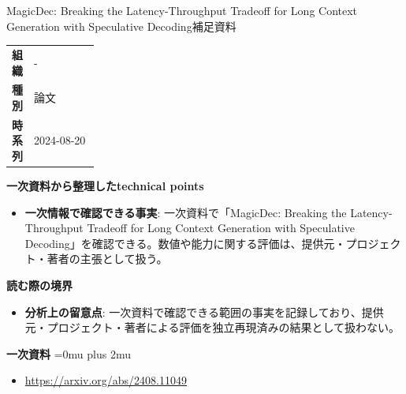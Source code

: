 \begin{technicalnote}{MagicDec: Breaking the Latency-Throughput Tradeoff for Long Context Generation with Speculative Decoding}{補足資料}
\begingroup
\begin{tabularx}{\linewidth}{@{}>{\bfseries}p{0.22\linewidth}X@{}}
組織 & - \\
種別 & 論文 \\
時系列 & 2024-08-20 \\
\end{tabularx}
\smallskip
{\bfseries 一次資料から整理したtechnical points}
\begin{itemize}[leftmargin=1.5em,itemsep=0.35em]
\item \textbf{一次情報で確認できる事実}: 一次資料で「MagicDec: Breaking the Latency-Throughput Tradeoff for Long Context Generation with Speculative Decoding」を確認できる。数値や能力に関する評価は、提供元・プロジェクト・著者の主張として扱う。
\end{itemize}
\begin{minipage}{\linewidth}
{\bfseries 読む際の境界}
\begin{itemize}[leftmargin=1.5em,itemsep=0.35em]
\item \textbf{分析上の留意点}: 一次資料で確認できる範囲の事実を記録しており、提供元・プロジェクト・著者による評価を独立再現済みの結果として扱わない。
\end{itemize}
\begin{samepage}
{\bfseries 一次資料}
\begingroup\sloppy
\Urlmuskip=0mu plus 2mu\relax
\begin{itemize}[leftmargin=1.5em,itemsep=0.25em]
\item {\scriptsize\url{https://arxiv.org/abs/2408.11049}}
\end{itemize}
\endgroup
\end{samepage}
\end{minipage}
\endgroup
\end{technicalnote}
\medskip

